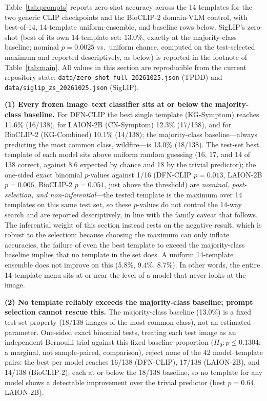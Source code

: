 \documentclass[10pt,a4paper]{article}
\begin{document}
Table~\ref{tab:prompts} reports zero-shot accuracy across the 14 templates for the two generic CLIP checkpoints and the BioCLIP-2 domain-VLM control, with best-of-14, 14-template uniform-ensemble, and baseline rows below. SigLIP's zero-shot (best of its own 14-template set: 13.0\%, exactly at the majority-class baseline; nominal $p=0.0025$ vs.\ uniform chance, computed on the test-selected maximum and reported descriptively, as below) is reported in the footnote of Table~\ref{tab:main}. All values in this section are reproducible from the current repository state: \texttt{data/zero\_shot\_full\_20261025.json} (TPDD) and \texttt{data/siglip\_zs\_20261025.json} (SigLIP).

\textbf{(1) Every frozen image--text classifier sits at or below the majority-class baseline.}
For DFN-CLIP the best single template (KG-Symptom) reaches 11.6\% (16/138), for LAION-2B (CN-Symptom) 12.3\% (17/138), and for BioCLIP-2 (KG-Combined) 10.1\% (14/138); the majority-class baseline---always predicting the most common class, wildfire---is 13.0\% (18/138).
The test-set best template of each model sits above uniform random guessing (16, 17, and 14 of 138 correct, against 8.6 expected by chance and 18 by the trivial predictor); the one-sided exact binomial $p$-values against 1/16 (DFN-CLIP $p{=}0.013$, LAION-2B $p{=}0.006$, BioCLIP-2 $p{=}0.051$, just above the threshold) are \emph{nominal, post-selection, and non-inferential}---the tested template is the maximum over 14 templates on this same test set, so these $p$-values do not control the 14-way search and are reported descriptively, in line with the family caveat that follows. The inferential weight of this section instead rests on the negative result, which is robust to the selection: because choosing the maximum can only inflate accuracies, the failure of even the best template to exceed the majority-class baseline implies that no template in the set does.
A uniform 14-template ensemble does not improve on this (5.8\%, 9.4\%, 8.7\%).
In other words, the entire 14-template menu sits at or near the level of a model that never looks at the image.

\textbf{(2) No template reliably exceeds the majority-class baseline; prompt selection cannot rescue this.}
The majority-class baseline (13.0\%) is a fixed test-set property (18/138 images of the most common class), not an estimated parameter.
One-sided exact binomial tests, treating each test image as an independent Bernoulli trial against this fixed baseline proportion ($H_0: p \leq 0.1304$; a marginal, not sample-paired, comparison), reject none of the 42 model--template pairs: the best per model reaches 16/138 (DFN-CLIP), 17/138 (LAION-2B), and 14/138 (BioCLIP-2), each at or below the 18/138 baseline, so no template for any model shows a detectable improvement over the trivial predictor (best $p=0.64$, LAION-2B).
\end{document}
